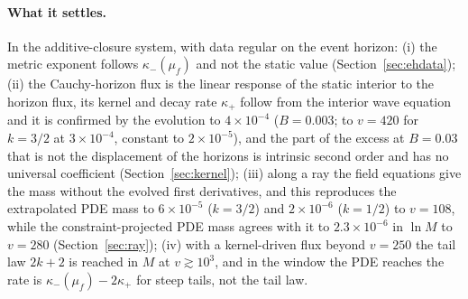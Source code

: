 \documentclass[11pt]{article}
\begin{document}
\paragraph{What it settles.} In the additive-closure system, with data regular on the event horizon: (i) the metric exponent follows $\kappa_-(\mu_f)$ and not the static value (Section~\ref{sec:ehdata}); (ii) the Cauchy-horizon flux is the linear response of the static interior to the horizon flux, its kernel and decay rate $\kappa_+$ follow from the interior wave equation and it is confirmed by the evolution to $4\times10^{-4}$ ($B=0.003$; to $v=420$ for $k=3/2$ at $3\times10^{-4}$, constant to $2\times10^{-5}$), and the part of the excess at $B=0.03$ that is not the displacement of the horizons is intrinsic second order and has no universal coefficient (Section~\ref{sec:kernel}); (iii) along a ray the field equations give the mass without the evolved first derivatives, and this reproduces the extrapolated PDE mass to $6\times10^{-5}$ ($k=3/2$) and $2\times10^{-6}$ ($k=1/2$) to $v=108$, while the constraint-projected PDE mass agrees with it to $2.3\times10^{-6}$ in $\ln M$ to $v=280$ (Section~\ref{sec:ray}); (iv) with a kernel-driven flux beyond $v=250$ the tail law $2k+2$ is reached in $M$ at $v\gtrsim10^{3}$, and in the window the PDE reaches the rate is $\kappa_-(\mu_f)-2\kappa_+$ for steep tails, not the tail law.
\end{document}

